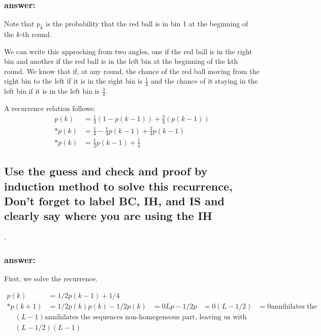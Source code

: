 \documentclass[titlepage]{article}\usepackage[]{graphicx}\usepackage[]{color}
\theoremstyle{definition}
\begin{document}
  \subsubsection{answer:}
    Note that $p_k$ is the probability that the red ball is in bin 1 at the beginning of
    the $k$-th round.

    We can write this approching from two angles, one if the red ball is in the
    right bin and another if the red ball is in the left bin at the beginning of
    the kth round. 
    We know that if, at any round, the chance of the red ball moving from the right
    bin to the left if it is in the right bin is $\frac{1}{4}$ and the chance of it
    staying in the left bin if it is in the left bin is $\frac{3}{4}$. 

    A recurrence relation follows:
    \begin{align}
      p(k) & = \frac{1}{4}\left(1 - p(k-1)\right) + \frac{3}{4}\left(p\left(k-1\right)\right) \\*
      p(k) & = \frac{1}{4} - \frac{1}{4}p(k-1) + \frac{3}{4}p(k-1) \\*
      p(k) & = \frac{1}{2}p(k-1) + \frac{1}{4} 
    \end{align}


\subsection{Use the guess and check and proof by induction method to solve this
	recurrence, Don't forget to label BC, IH, and IS and clearly say where you
	are using the IH}.
  \subsubsection{answer:}
    First, we solve the recurrence.

    \begin{align}
      p(k) & = 1/2 p(k -1) + 1/4 \\*
      p(k+1) & = 1/2 p(k)
      p(k) - 1/2 p(k) & =  0 
      Lp - 1/2 p & = 0
      \left( L - 1/2 \right) & = 0 \text{annihilates the sequences homegeneous
      part}
    \end{align}
    \begin{align}
      \left(L - 1\right) \text{annihilates the sequences non-homegeneous
      part, leaving us with }\\
      \left( L - 1/2 \right) \left(L - 1\right)
    \end{align}
\end{document}
